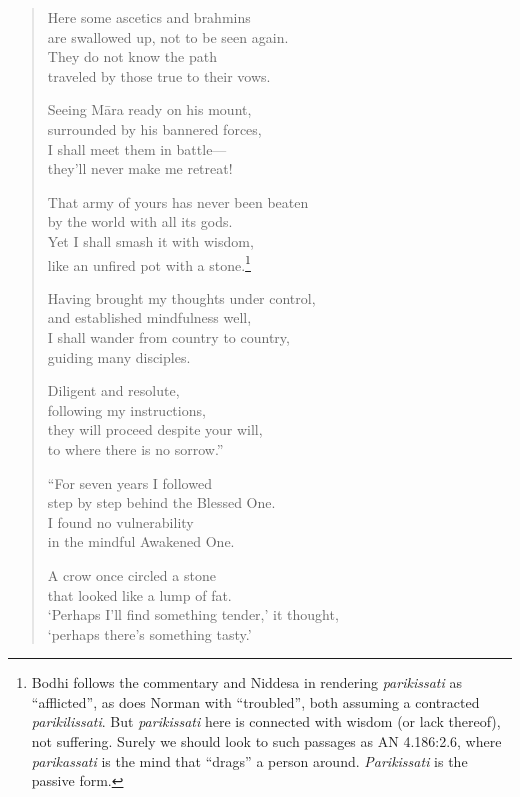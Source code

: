 \documentclass[12pt,openany]{book}%
\begin{document}
\begin{verse}
Here some ascetics and brahmins \\
are swallowed up, not to be seen again. \\
They do not know the path \\
traveled by those true to their vows. 

Seeing \textsanskrit{Māra} ready on his mount, \\
surrounded by his bannered forces, \\
I shall meet them in battle—\\
they’ll never make me retreat! 

That army of yours has never been beaten \\
by the world with all its gods. \\
Yet I shall smash it with wisdom, \\
like an unfired pot with a stone.\footnote{Bodhi follows the commentary and Niddesa in rendering \textit{parikissati} as “afflicted”, as does Norman with “troubled”, both assuming a contracted \textit{parikilissati}. But \textit{parikissati} here is connected with wisdom (or lack thereof), not suffering. Surely we should look to such passages as AN 4.186:2.6, where \textit{parikassati} is the mind that “drags” a person around. \textit{Parikissati} is the passive form. } 

Having brought my thoughts under control, \\
and established mindfulness well, \\
I shall wander from country to country, \\
guiding many disciples. 

Diligent and resolute, \\
following my instructions, \\
they will proceed despite your will, \\
to where there is no sorrow.” 

“For seven years I followed \\
step by step behind the Blessed One. \\
I found no vulnerability \\
in the mindful Awakened One. 

A crow once circled a stone \\
that looked like a lump of fat. \\
‘Perhaps I’ll find something tender,’ it thought, \\
‘perhaps there’s something tasty.’ 


\end{verse}
\end{document}
